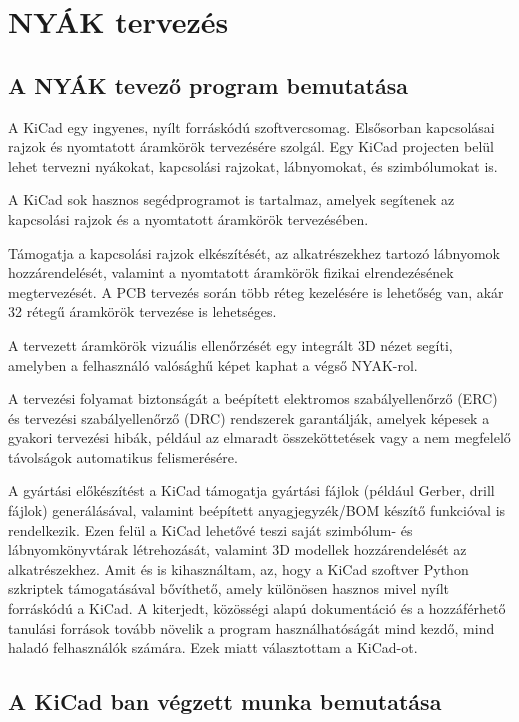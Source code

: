 \documentclass[a4paper,12pt,oneside]{book}
\begin{document}
\section{NYÁK tervezés}
\subsection{A NYÁK tevező program bemutatása}
A KiCad egy ingyenes, nyílt forráskódú szoftvercsomag. Elsősorban kapcsolásai rajzok és nyomtatott áramkörök tervezésére szolgál. Egy KiCad projecten belül lehet tervezni nyákokat, kapcsolási rajzokat, lábnyomokat, és szimbólumokat is.

A KiCad sok hasznos segédprogramot is tartalmaz, amelyek segítenek az kapcsolási rajzok és a nyomtatott áramkörök tervezésében. 

Támogatja a kapcsolási rajzok elkészítését, az alkatrészekhez tartozó lábnyomok hozzárendelését, valamint a nyomtatott áramkörök fizikai elrendezésének megtervezését. A PCB tervezés során több réteg kezelésére is lehetőség van, akár 32 rétegű áramkörök tervezése is lehetséges. 

A tervezett áramkörök vizuális ellenőrzését egy integrált 3D nézet segíti, amelyben a felhasználó valósághű képet kaphat a végső NYAK-rol. 

A tervezési folyamat biztonságát a beépített elektromos szabályellenőrző (ERC) és tervezési szabályellenőrző (DRC) rendszerek garantálják, amelyek képesek a gyakori tervezési hibák, például az elmaradt összeköttetések vagy a nem megfelelő távolságok automatikus felismerésére. 

A gyártási előkészítést a KiCad támogatja gyártási fájlok (például Gerber, drill fájlok) generálásával, valamint beépített anyagjegyzék/BOM készítő funkcióval is rendelkezik. Ezen felül a KiCad lehetővé teszi saját szimbólum- és lábnyomkönyvtárak létrehozását, valamint 3D modellek hozzárendelését az alkatrészekhez. 
Amit és is kihasználtam, az, hogy a KiCad szoftver Python szkriptek támogatásával bővíthető, amely különösen hasznos mivel nyílt forráskódú a KiCad. A kiterjedt, közösségi alapú dokumentáció és a hozzáférhető tanulási források tovább növelik a program használhatóságát mind kezdő, mind haladó felhasználók számára. Ezek miatt választottam a KiCad-ot.
\subsection{A KiCad ban végzett munka bemutatása} 
\end{document}
